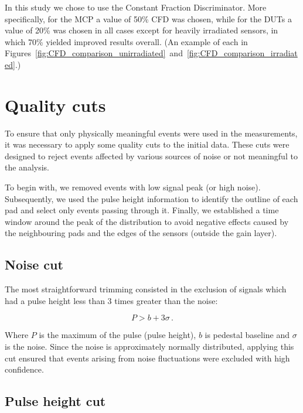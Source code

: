 In this study we chose to use the Constant Fraction Discriminator. More specifically, for the MCP a value of 50\% CFD was chosen, while for the DUTs a value of 20\% was chosen in all cases except for heavily irradiated sensors, in which 70\% yielded improved results overall. (An example of each in Figures~\ref{fig:CFD_comparison_unirradiated}~and~\ref{fig:CFD_comparison_irradiated}.)

\FloatBarrier

\section{Quality cuts}\label{sec:qualtiy_cuts}

To ensure that only physically meaningful events were used in the measurements, it was necessary to apply some quality cuts to the initial data. These cuts were designed to reject events affected by various sources of noise or not meaningful to the analysis. 

To begin with, we removed events with low signal peak (or high noise). Subsequently, we used the pulse height information to identify the outline of each pad and select only events passing through it. Finally, we established a time window around the peak of the distribution to avoid negative effects caused by the neighbouring pads and the edges of the sensors (outside the gain layer).

\subsection{Noise cut}\label{subsec:noise_cut}
The most straightforward trimming consisted in the exclusion of signals which had a pulse height less than 3 times greater than the noise:

\begin{equation*}
    P > b + 3\sigma \, .
\end{equation*}

Where \(P\) is the maximum of the pulse (pulse height), \(b\) is pedestal baseline and \(\sigma\) is the noise. Since the noise is approximately normally distributed, applying this cut ensured that events arising from noise fluctuations were excluded with high confidence.

\subsection{Pulse height cut}\label{subsec:pulseHeight_cut}


